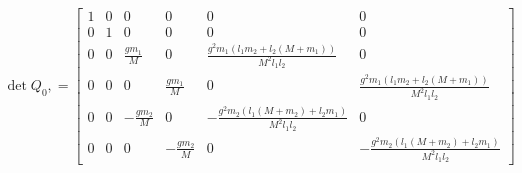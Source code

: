 \documentclass[preview]{standalone}
\begin{document}
\begin{align*}
\operatorname{det}Q_0, = \left[\begin{matrix}1 & 0 & 0 & 0 & 0 & 0\\0 & 1 & 0 & 0 & 0 & 0\\0 & 0 & \frac{g m_{1}}{M} & 0 & \frac{g^{2} m_{1} \left(l_{1} m_{2} + l_{2} \left(M + m_{1}\right)\right)}{M^{2} l_{1} l_{2}} & 0\\0 & 0 & 0 & \frac{g m_{1}}{M} & 0 & \frac{g^{2} m_{1} \left(l_{1} m_{2} + l_{2} \left(M + m_{1}\right)\right)}{M^{2} l_{1} l_{2}}\\0 & 0 & - \frac{g m_{2}}{M} & 0 & - \frac{g^{2} m_{2} \left(l_{1} \left(M + m_{2}\right) + l_{2} m_{1}\right)}{M^{2} l_{1} l_{2}} & 0\\0 & 0 & 0 & - \frac{g m_{2}}{M} & 0 & - \frac{g^{2} m_{2} \left(l_{1} \left(M + m_{2}\right) + l_{2} m_{1}\right)}{M^{2} l_{1} l_{2}}\end{matrix}\right]
\end{align*}
\end{document}
